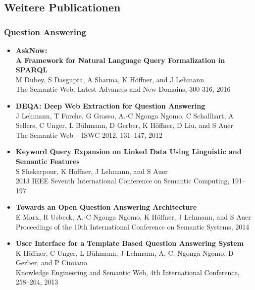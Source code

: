 \documentclass{article}
\begin{document}
\subsection*{Weitere Publicationen}

\subsubsection*{Question Answering}

\begin{itemize}
\item \textbf{AskNow:}\\
\textbf{A Framework for Natural Language Query Formalization in SPARQL}~\\
M Dubey, S Dasgupta, A Sharma, K Höffner, and J Lehmann\\
The Semantic Web. Latest Advances and New Domains, 300-316, 2016

\item \textbf{{DEQA}: {D}eep Web Extraction for {Q}uestion {A}nswering}~\\
J Lehmann, T Furche, G Grasso, A.-C Ngonga Ngomo, C Schallhart, A Sellers, C Unger, L Bühmann, D Gerber, K Höffner, D Liu, and S Auer\\
The Semantic Web -- ISWC 2012, 131--147, 2012

\item \textbf{Keyword Query Expansion on Linked Data Using Linguistic and Semantic Features}~\\
S Shekarpour, K Höffner, J Lehmann, and S Auer\\
2013 IEEE Seventh International Conference on Semantic Computing, 191–197%

\item \textbf{Towards an Open Question Answering Architecture}~\\
E Marx, R Usbeck, A.-C Ngonga Ngomo, K Höffner, J Lehmann, and S Auer\\
Proceedings of the 10th International Conference on Semantic Systems, 2014

\item \textbf{User Interface for a Template Based Question Answering System}~\\
K Höffner, C Unger, L Bühmann, J Lehmann, A.-C. Ngonga Ngomo, D Gerber, and P Cimiano\\
Knowledge Engineering and Semantic Web, 4th International Conference, 258--264, 2013


\end{itemize}
\end{document}
